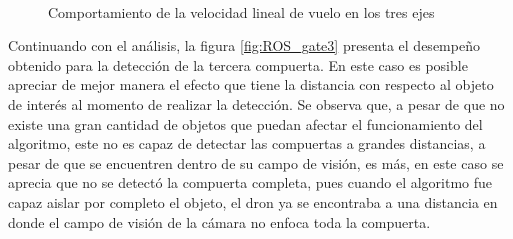 \begin{figure}[ht]
    \centering
     \hspace{0.2 pt}
     \hspace{0.2 pt}
     \hspace{0.2 pt}
     \\
     \hspace{0.2 pt}
     \hspace{0.2 pt}
     \hspace{0.2 pt}
    
    \caption{Comportamiento de la velocidad lineal de vuelo en los tres ejes}
    \label{fig:ROS_gate2}
\end{figure}


Continuando con el análisis, la figura \ref{fig:ROS_gate3} presenta el desempeño obtenido para la detección de la tercera compuerta. En este caso es posible apreciar de mejor manera el efecto que tiene la distancia con respecto al objeto de interés al momento de realizar la detección. Se observa que, a pesar de que no existe una gran cantidad de objetos que puedan afectar el funcionamiento del algoritmo, este no es capaz de detectar las compuertas a grandes distancias, a pesar de que se encuentren dentro de su campo de visión, es más, en este caso se aprecia que no se detectó la compuerta completa, pues cuando el algoritmo fue capaz aislar por completo el objeto, el dron ya se encontraba a una distancia en donde el campo de visión de la cámara no enfoca toda la compuerta.

